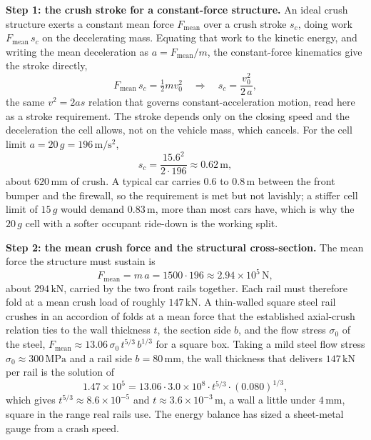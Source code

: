 \textbf{Step 1: the crush stroke for a constant-force structure.} An ideal
crush structure exerts a constant mean force $F_\text{mean}$ over a crush
stroke $s_c$, doing work $F_\text{mean}\,s_c$ on the decelerating mass.
Equating that work to the kinetic energy, and writing the mean deceleration
as $a = F_\text{mean}/m$, the constant-force kinematics give the stroke
directly,
\[
F_\text{mean}\,s_c = \tfrac12 m v_0^2
\quad\Longrightarrow\quad
s_c = \frac{v_0^2}{2\,a},
\]
the same $v^2 = 2 a s$ relation that governs constant-acceleration motion,
read here as a stroke requirement. The stroke depends only on the closing
speed and the deceleration the cell allows, not on the vehicle mass, which
cancels. For the cell limit $a = 20\,g = 196\,\si{\meter\per\second
\squared}$,
\[
s_c = \frac{15.6^2}{2 \cdot 196} \approx 0.62\,\si{\meter},
\]
about $620\,\si{\milli\meter}$ of crush. A typical car carries $0.6$ to
$0.8\,\si{\meter}$ between the front bumper and the firewall, so the
requirement is met but not lavishly; a stiffer cell limit of $15\,g$ would
demand $0.83\,\si{\meter}$, more than most cars have, which is why the
$20\,g$ cell with a softer occupant ride-down is the working split.

\textbf{Step 2: the mean crush force and the structural cross-section.} The
mean force the structure must sustain is
\[
F_\text{mean} = m\,a = 1500 \cdot 196 \approx 2.94\times 10^{5}\,
\si{\newton},
\]
about $294\,\si{\kilo\newton}$, carried by the two front rails together.
Each rail must therefore fold at a mean crush load of roughly
$147\,\si{\kilo\newton}$. A thin-walled square steel rail crushes in an
accordion of folds at a mean force that the established axial-crush relation
ties to the wall thickness $t$, the section side $b$, and the flow stress
$\sigma_0$ of the steel, $F_\text{mean} \approx 13.06\,\sigma_0\,t^{5/3}\,
b^{1/3}$ for a square box. Taking a mild steel flow stress $\sigma_0 \approx
300\,\si{\mega\pascal}$ and a rail side $b = 80\,\si{\milli\meter}$, the
wall thickness that delivers $147\,\si{\kilo\newton}$ per rail is the
solution of
\[
1.47\times 10^{5} = 13.06 \cdot 3.0\times 10^{8}\cdot t^{5/3}\cdot
(0.080)^{1/3},
\]
which gives $t^{5/3} \approx 8.6\times 10^{-5}$ and $t \approx 3.6\times
10^{-3}\,\si{\meter}$, a wall a little under $4\,\si{\milli\meter}$, square
in the range real rails use. The energy balance has sized a sheet-metal
gauge from a crash speed.



